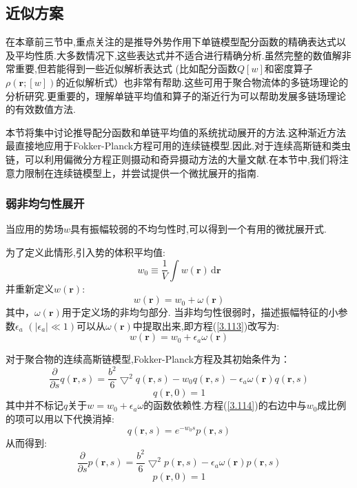 \subsection{近似方案}
在本章前三节中,重点关注的是推导外势作用下单链模型配分函数的精确表达式以及平均性质.大多数情况下,这些表达式并不适合进行精确分析.虽然完整的数值解非常重要,但若能得到一些近似解析表达式
(比如配分函数$Q[w]$和密度算子$\rho(\mathbf{r};[w])$的近似解析式）也非常有帮助.这些可用于聚合物流体的多链场理论的分析研究.更重要的，理解单链平均值和算子的渐近行为可以帮助发展多链场理论的有效数值方法.

本节将集中讨论推导配分函数和单链平均值的系统扰动展开的方法.这种渐近方法最直接地应用于Fokker-Planck方程可用的连续链模型.因此,对于连续高斯链和类虫链，可以利用偏微分方程正则摄动和奇异摄动方法的大量文献.在本节中,我们将注意力限制在连续链模型上，并尝试提供一个微扰展开的指南.
\subsubsection{弱非均匀性展开}
当应用的势场$w$具有振幅较弱的不均匀性时,可以得到一个有用的微扰展开式.

为了定义此情形,引入势的体积平均值:
\begin{equation}
w_0\equiv \frac{1}{V} \int w(\mathbf{r})\,\mathrm{d}\mathbf{r}
\end{equation}
并重新定义$w(\mathbf{r})$:
\begin{equation}
w(\mathbf{r})=w_0+\omega(\mathbf{r}) \label{3.113}
\end{equation}
其中，$\omega(\mathbf{r})$用于定义场的非均匀部分.
当非均匀性很弱时，描述振幅特征的小参数$\epsilon_a$ $(|\epsilon_a| \ll 1)$可以从$\omega(\mathbf{r})$中提取出来,即方程(\ref{3.113})改写为:
$$w(\mathbf{r})=w_0+\epsilon_a \omega(\mathbf{r})$$

对于聚合物的连续高斯链模型,Fokker-Planck方程及其初始条件为：
\begin{equation}
\frac{\partial}{\partial s} q(\mathbf{r},s) = \frac{b^2}{6} \bigtriangledown^2 q(\mathbf{r},s) -w_0 q(\mathbf{r},s) -\epsilon_a \omega(\mathbf{r}) q(\mathbf{r},s) \label{3.114}
\end{equation}
\begin{equation}
q(\mathbf{r},0) = 1 \label{3.115}
\end{equation}
其中并不标记$q$关于$w = w_0+\epsilon_a \omega$的函数依赖性.方程(\ref{3.114})的右边中与$w_0$成比例的项可以用以下代换消掉:
\begin{equation}
q(\mathbf{r},s) = e^{-w_0 s} p(\mathbf{r},s) \label{3.116}
\end{equation}
从而得到:
\begin{equation}
\frac{\partial}{\partial s} p(\mathbf{r},s) = \frac{b^2}{6} \bigtriangledown^2 p(\mathbf{r},s) -\epsilon_a \omega(\mathbf{r}) p(\mathbf{r},s) \label{3.117}
\end{equation}
\begin{equation}
p(\mathbf{r},0) = 1 \label{3.118}
\end{equation}

